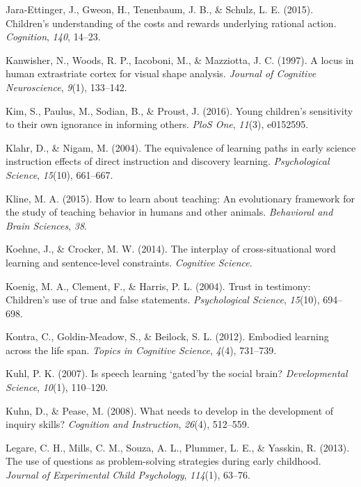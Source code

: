 \documentclass[oneside]{report}
\begin{document}
\leavevmode\hypertarget{ref-jara2015children}{}%
Jara-Ettinger, J., Gweon, H., Tenenbaum, J. B., \& Schulz, L. E. (2015).
Children's understanding of the costs and rewards underlying rational
action. \emph{Cognition}, \emph{140}, 14--23.

\leavevmode\hypertarget{ref-kanwisher1997locus}{}%
Kanwisher, N., Woods, R. P., Iacoboni, M., \& Mazziotta, J. C. (1997). A
locus in human extrastriate cortex for visual shape analysis.
\emph{Journal of Cognitive Neuroscience}, \emph{9}(1), 133--142.

\leavevmode\hypertarget{ref-kim2016young}{}%
Kim, S., Paulus, M., Sodian, B., \& Proust, J. (2016). Young children's
sensitivity to their own ignorance in informing others. \emph{PloS One},
\emph{11}(3), e0152595.

\leavevmode\hypertarget{ref-klahr2004equivalence}{}%
Klahr, D., \& Nigam, M. (2004). The equivalence of learning paths in
early science instruction effects of direct instruction and discovery
learning. \emph{Psychological Science}, \emph{15}(10), 661--667.

\leavevmode\hypertarget{ref-kline2015learn}{}%
Kline, M. A. (2015). How to learn about teaching: An evolutionary
framework for the study of teaching behavior in humans and other
animals. \emph{Behavioral and Brain Sciences}, \emph{38}.

\leavevmode\hypertarget{ref-koehne2014interplay}{}%
Koehne, J., \& Crocker, M. W. (2014). The interplay of cross-situational
word learning and sentence-level constraints. \emph{Cognitive Science}.

\leavevmode\hypertarget{ref-koenig2004trust}{}%
Koenig, M. A., Clement, F., \& Harris, P. L. (2004). Trust in testimony:
Children's use of true and false statements. \emph{Psychological
Science}, \emph{15}(10), 694--698.

\leavevmode\hypertarget{ref-kontra2012embodied}{}%
Kontra, C., Goldin-Meadow, S., \& Beilock, S. L. (2012). Embodied
learning across the life span. \emph{Topics in Cognitive Science},
\emph{4}(4), 731--739.

\leavevmode\hypertarget{ref-kuhl2007speech}{}%
Kuhl, P. K. (2007). Is speech learning `gated'by the social brain?
\emph{Developmental Science}, \emph{10}(1), 110--120.

\leavevmode\hypertarget{ref-kuhn2008needs}{}%
Kuhn, D., \& Pease, M. (2008). What needs to develop in the development
of inquiry skills? \emph{Cognition and Instruction}, \emph{26}(4),
512--559.

\leavevmode\hypertarget{ref-legare2013use}{}%
Legare, C. H., Mills, C. M., Souza, A. L., Plummer, L. E., \& Yasskin,
R. (2013). The use of questions as problem-solving strategies during
early childhood. \emph{Journal of Experimental Child Psychology},
\emph{114}(1), 63--76.
\end{document}
